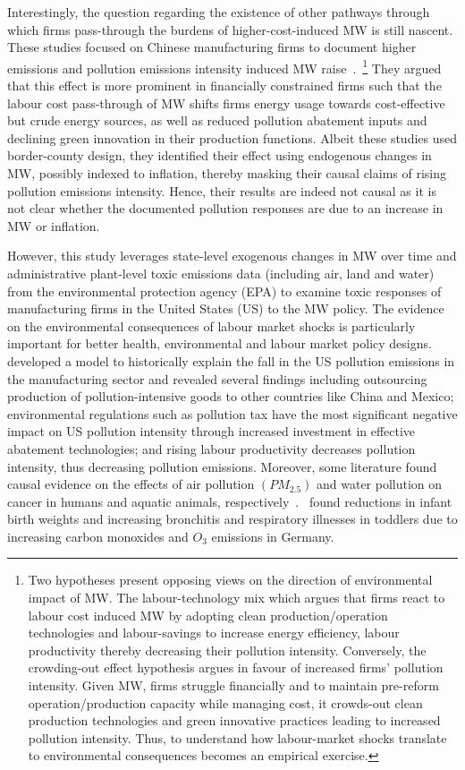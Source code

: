 \documentclass{C:/Users/david/OneDrive/Documents/ULMS/PhD/Thesis/chapter3/src/climate_change/latex/Economic_Journal/OUP-EJ}
\begin{document}
    Interestingly, the question regarding the existence of other pathways through which firms pass-through the burdens of higher-cost-induced MW is still nascent. These studies focused on Chinese manufacturing firms to document higher emissions and pollution emissions intensity induced MW raise~\citep{li2023does, zhang2023unintended}.~\footnote{\tiny Two hypotheses present opposing views on the direction of environmental impact of MW. The labour-technology mix which argues that firms react to labour cost induced MW by adopting clean production/operation technologies and labour-savings to increase energy efficiency, labour productivity thereby decreasing their pollution intensity. Conversely, the crowding-out effect hypothesis argues in favour of increased firms' pollution intensity. Given MW, firms struggle financially and to maintain pre-reform operation/production capacity while managing cost, it crowds-out clean production technologies and green innovative practices leading to increased pollution intensity. Thus, to understand how labour-market shocks translate to environmental consequences becomes an empirical exercise.} They argued that this effect is more prominent in financially constrained firms such that the labour cost pass-through of MW shifts firms energy usage towards cost-effective but crude energy sources, as well as reduced pollution abatement inputs and declining green innovation in their production functions. Albeit these studies used border-county design, they identified their effect using endogenous changes in MW, possibly indexed to inflation, thereby masking their causal claims of rising pollution emissions intensity. Hence, their results are indeed not causal as it is not clear whether the documented pollution responses are due to an increase in MW or inflation.

    However, this study leverages state-level exogenous changes in MW over time and administrative plant-level toxic emissions data (including air, land and water) from the environmental protection agency (EPA) to examine toxic responses of manufacturing firms in the United States (US) to the MW policy. The evidence on the environmental consequences of labour market shocks is particularly important for better health, environmental and labour market policy designs.~\citet{shapiro2018pollution} developed a model to historically explain the fall in the US pollution emissions in the manufacturing sector and revealed several findings including outsourcing production of pollution-intensive goods to other countries like China and Mexico; environmental regulations such as pollution tax have the most significant negative impact on US pollution intensity through increased investment in effective abatement technologies; and rising labour productivity decreases pollution intensity, thus decreasing pollution emissions. Moreover, some literature found causal evidence on the effects of air pollution $(PM_{2.5})$ and water pollution on cancer in humans and aquatic animals, respectively~\citep{turner2020outdoor, turner2017ambient, baines2021linking}.~\citet{coneus2012pollution} found reductions in infant birth weights and increasing bronchitis and respiratory illnesses in toddlers due to increasing carbon monoxides and $O_{3}$ emissions in Germany.
\end{document}
